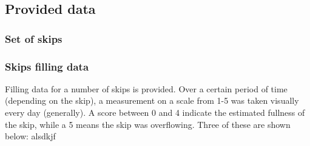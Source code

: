 \documentclass[
  letterpaper,
  DIV=11,
  numbers=noendperiod]{scrartcl}
\begin{document}
\hypertarget{provided-data}{%
\subsection{Provided data}\label{provided-data}}

\hypertarget{set-of-skips}{%
\subsubsection{Set of skips}\label{set-of-skips}}

\hypertarget{skips-filling-data}{%
\subsubsection{Skips filling data}\label{skips-filling-data}}

Filling data for a number of skips is provided. Over a certain period of
time (depending on the skip), a measurement on a scale from 1-5 was
taken visually every day (generally). A score between 0 and 4 indicate
the estimated fullness of the skip, while a 5 means the skip was
overflowing. Three of these are shown below: alsdkjf
\end{document}
